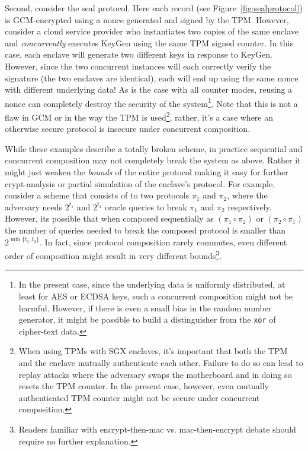 \documentclass[letterpaper]{article}
\begin{document}
  Second, consider the seal protocol. Here each record (see
  Figure~\ref{fig:sealprotocol}) is GCM-encrypted using a nonce
  generated and signed by the TPM. However, consider a cloud service
  provider who instantiates two copies of the same enclave and
  \textit{concurrently} executes \textsf{KeyGen} using the same TPM
  signed counter. In this case, each enclave will generate two
  different keys in response to \textsf{KeyGen}. However, since the
  two concurrent instances will each correctly verify the signature
  (the two enclaves are identical), each will end up using the same
  nonce with different underlying data! As is the case with all
  counter modes, reusing a nonce can completely destroy the security
  of the system\footnote{In the present case, since the underlying
    data is uniformly distributed, at least for AES or ECDSA keys,
    such a concurrent composition might not be harmful. However, if
    there is even a small bias in the random number generator, it
    might be possible to build a distinguisher from the \texttt{xor}
    of cipher-text data.}. Note that this is not a flaw in GCM or in
  the way the TPM is used\footnote{When using TPMs with SGX enclaves,
    it's important that both the TPM and the enclave mutually
    authenticate each other. Failure to do so can lead to replay
    attacks where the adversary swaps the motherboard and in doing so
    resets the TPM counter. In the present case, however, even
    mutually authenticated TPM counter might not be secure under
    concurrent composition.}, rather, it's a case where an otherwise
  secure protocol is insecure under concurrent composition.

  While these examples describe a totally broken scheme, in practice
  sequential and concurrent composition may not completely break the
  system as above. Rather it might just weaken the \textit{bounds} of
  the entire protocol making it easy for further crypt-analysis or
  partial simulation of the enclave's protocol. For example, consider
  a scheme that consists of to two protocols $\pi_1$ and $\pi_2$,
  where the adversary needs $2^{t_1}$ and $2^{t_2}$ oracle queries to
  break $\pi_1$ and $\pi_2$ respectively. However, its possible that
  when composed sequentially as $(\pi_1 \circ \pi_2)$ or $(\pi_2 \circ
  \pi_1)$ the number of queries needed to break the composed protocol
  is smaller than $2^{\min\{t_1,t_2\}}$. In fact, since protocol
  composition rarely commutes, even different order of composition
  might result in very different bounds\footnote{Readers familiar with
    \textsf{encrypt-then-mac} vs.  \textsf{mac-then-encrypt} debate
    should require no further explanation.}.
\end{document}
